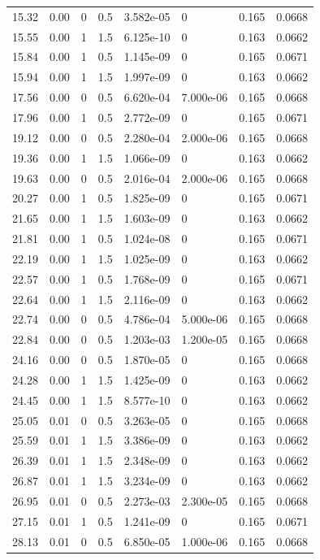 \documentclass[preview]{standalone}
\begin{document}
{{\begin{tabular}{L{1.2cm}C{1.2cm} C{0.3cm}C{0.5cm} C{1.4cm}C{1.4cm} C{1.4cm}C{1.4cm}}
  15.32  &  0.00  & 0     & 0.5 &  3.582e-05  & 0  & 0.165 &  0.0668   \\ 
  15.55  &  0.00  & 1     & 1.5 &  6.125e-10  & 0  & 0.163 &  0.0662   \\ 
  15.84  &  0.00  & 1     & 0.5 &  1.145e-09  & 0  & 0.165 &  0.0671   \\ 
  15.94  &  0.00  & 1     & 1.5 &  1.997e-09  & 0  & 0.163 &  0.0662   \\ 
  17.56  &  0.00  & 0     & 0.5 &  6.620e-04  & 7.000e-06  & 0.165 &  0.0668   \\ 
  17.96  &  0.00  & 1     & 0.5 &  2.772e-09  & 0  & 0.165 &  0.0671   \\ 
  19.12  &  0.00  & 0     & 0.5 &  2.280e-04  & 2.000e-06  & 0.165 &  0.0668   \\ 
  19.36  &  0.00  & 1     & 1.5 &  1.066e-09  & 0  & 0.163 &  0.0662   \\ 
  19.63  &  0.00  & 0     & 0.5 &  2.016e-04  & 2.000e-06  & 0.165 &  0.0668   \\ 
  20.27  &  0.00  & 1     & 0.5 &  1.825e-09  & 0  & 0.165 &  0.0671   \\ 
  21.65  &  0.00  & 1     & 1.5 &  1.603e-09  & 0  & 0.163 &  0.0662   \\ 
  21.81  &  0.00  & 1     & 0.5 &  1.024e-08  & 0  & 0.165 &  0.0671   \\ 
  22.19  &  0.00  & 1     & 1.5 &  1.025e-09  & 0  & 0.163 &  0.0662   \\ 
  22.57  &  0.00  & 1     & 0.5 &  1.768e-09  & 0  & 0.165 &  0.0671   \\ 
  22.64  &  0.00  & 1     & 1.5 &  2.116e-09  & 0  & 0.163 &  0.0662   \\ 
  22.74  &  0.00  & 0     & 0.5 &  4.786e-04  & 5.000e-06  & 0.165 &  0.0668   \\ 
  22.84  &  0.00  & 0     & 0.5 &  1.203e-03  & 1.200e-05  & 0.165 &  0.0668   \\ 
  24.16  &  0.00  & 0     & 0.5 &  1.870e-05  & 0  & 0.165 &  0.0668   \\ 
  24.28  &  0.00  & 1     & 1.5 &  1.425e-09  & 0  & 0.163 &  0.0662   \\ 
  24.45  &  0.00  & 1     & 1.5 &  8.577e-10  & 0  & 0.163 &  0.0662   \\ 
  25.05  &  0.01  & 0     & 0.5 &  3.263e-05  & 0  & 0.165 &  0.0668   \\ 
  25.59  &  0.01  & 1     & 1.5 &  3.386e-09  & 0  & 0.163 &  0.0662   \\ 
  26.39  &  0.01  & 1     & 1.5 &  2.348e-09  & 0  & 0.163 &  0.0662   \\ 
  26.87  &  0.01  & 1     & 1.5 &  3.234e-09  & 0  & 0.163 &  0.0662   \\ 
  26.95  &  0.01  & 0     & 0.5 &  2.273e-03  & 2.300e-05  & 0.165 &  0.0668   \\ 
  27.15  &  0.01  & 1     & 0.5 &  1.241e-09  & 0  & 0.165 &  0.0671   \\ 
  28.13  &  0.01  & 0     & 0.5 &  6.850e-05  & 1.000e-06  & 0.165 &  0.0668   \\ 
\hline 
\end{tabular} 

}}
\end{document}
